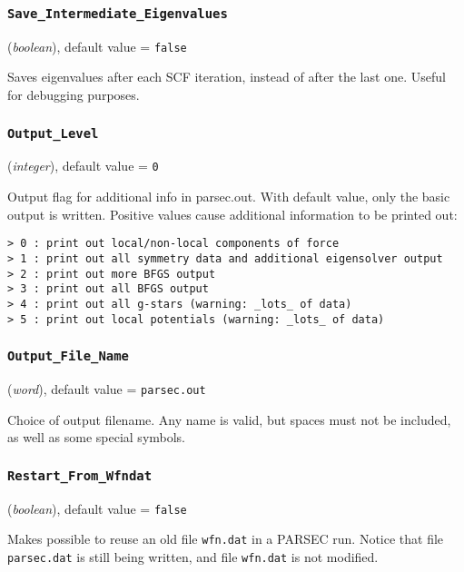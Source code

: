 \documentclass{article}
\begin{document}
\subsubsection{\tt Save\_Intermediate\_Eigenvalues 
\label{SaveIntermediateEigenvalues}}
({\it boolean}),
default value = {\tt false }

Saves eigenvalues after each SCF iteration, instead of after the last one.
Useful for debugging purposes.

\subsubsection{\tt Output\_Level 
\label{OutputLevel}}
({\it integer}),
default value = {\tt 0 }

Output flag for additional info in parsec.out. With default value,
only the basic output is written. Positive values cause additional
information to be printed out:

\begin{verbatim}
> 0 : print out local/non-local components of force
> 1 : print out all symmetry data and additional eigensolver output
> 2 : print out more BFGS output
> 3 : print out all BFGS output
> 4 : print out all g-stars (warning: _lots_ of data)
> 5 : print out local potentials (warning: _lots_ of data)
\end{verbatim}

\subsubsection{\tt Output\_File\_Name 
\label{OutputFileName}}
({\it word}),
default value = {\tt parsec.out }

Choice of output filename. Any name is valid, but spaces must not be
included, as well as some special symbols.

\subsubsection{\tt Restart\_From\_Wfndat 
\label{RestartFromWfndat}}
({\it boolean}),
default value = {\tt false }

Makes possible to reuse an old file {\tt wfn.dat} in a PARSEC
run. Notice that file {\tt parsec.dat} is still being written, and
file {\tt wfn.dat} is not modified.
\end{document}

